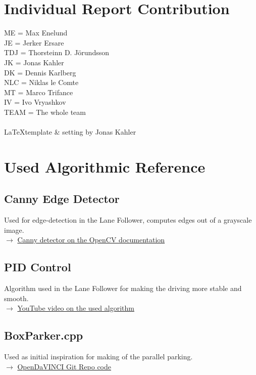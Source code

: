 \label{appendix}
\appendix

\chapter{Individual Report Contribution}
ME = Max Enelund\\
JE = Jerker Ersare\\
TDJ = Thorsteinn D. J{\"o}rundsson\\
JK = Jonas Kahler\\
DK = Dennis Karlberg\\
NLC = Niklas le Comte\\
MT = Marco Trifance\\
IV = Ivo Vryashkov\\
TEAM = The whole team\\\\
\LaTeX template \& setting by Jonas Kahler

\chapter{Used Algorithmic Reference}
\section{Canny Edge Detector}
Used for edge-detection in the Lane Follower, computes edges out of a grayscale
image.\\
$\rightarrow$
\href{http://docs.opencv.org/2.4/doc/tutorials/imgproc/imgtrans/canny_detector/canny_detector.html}{Canny detector on the OpenCV documentation}

\section{PID Control}
Algorithm used in the Lane Follower for making the driving more stable and
smooth.\\
$\rightarrow$
\href{https://www.youtube.com/watch?v=4Y7zG48uHRo}
{YouTube video on the used algorithm}

\section{BoxParker.cpp}
Used as initial inspiration for making of the parallel parking.\\
$\rightarrow$
\href{https://github.com/se-research/OpenDaVINCI/blob/master/automotive/miniature/boxparker/src/BoxParker.cpp}
{OpenDaVINCI Git Repo code}

